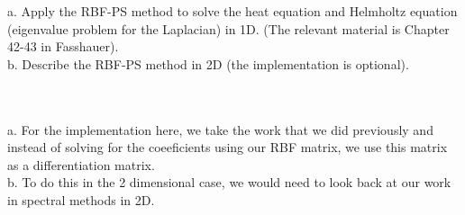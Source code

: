 a. Apply the RBF-PS method to solve the heat equation and Helmholtz equation (eigenvalue problem for the
Laplacian) in 1D. (The relevant material is Chapter 42-43 in Fasshauer).\\

b. Describe the RBF-PS method in 2D (the implementation is optional).\\\\

\begin{solution}\renewcommand{\qedsymbol}{}\ \\

    a. For the implementation here, we take the work that we did previously and instead of solving for
    the coeeficients using our RBF matrix, we use this matrix as a differentiation matrix.\\

    b. To do this in the 2 dimensional case, we would need to look back at our work in spectral methods
    in 2D.

\end{solution}